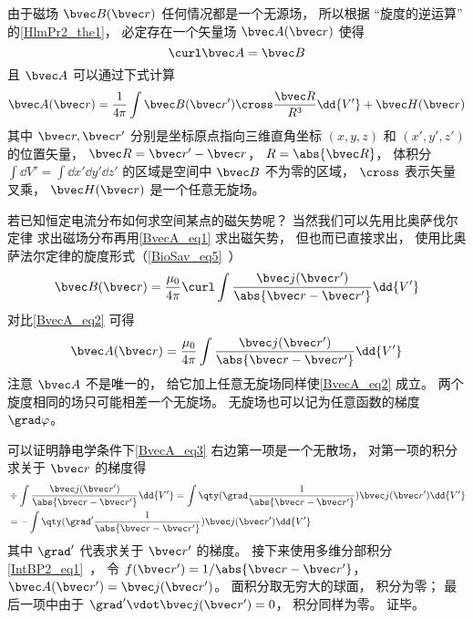 
\begin{issues}
\issueDraft
{}
\end{issues}


由于磁场 $\bvec B(\bvec r)$ 任何情况都是一个无源场， 所以根据 “旋度的逆运算” 的\autoref{HlmPr2_the1}， 必定存在一个矢量场 $\bvec A(\bvec r)$ 使得
\begin{equation}\label{BvecA_eq2}
\curl \bvec A = \bvec B
\end{equation}
且 $\bvec A$ 可以通过下式计算
\begin{equation}\label{BvecA_eq1}
\bvec A(\bvec r) = \frac{1}{4\pi} \int \bvec B(\bvec r') \cross \frac{\bvec R}{R^3} \dd{V'} + \bvec H(\bvec r)
\end{equation}
其中 $\bvec r, \bvec r'$ 分别是坐标原点指向三维直角坐标 $(x, y, z)$ 和 $(x', y', z')$ 的位置矢量， $\bvec R = \bvec r' - \bvec r$， $R = \abs{\bvec R}$， 体积分 $\int\dd{V'} = \int\dd{x'}\dd{y'}\dd{z'}$ 的区域是空间中 $\bvec B$ 不为零的区域， $\cross$ 表示矢量叉乘， $\bvec H(\bvec r)$ 是一个任意无旋场。

若已知恒定电流分布如何求空间某点的磁矢势呢？ 当然我们可以先用比奥萨伐尔定律 求出磁场分布再用\autoref{BvecA_eq1} 求出磁矢势， 但也而已直接求出， 使用比奥萨法尔定律的旋度形式（\autoref{BioSav_eq5}~）
\begin{equation}
\bvec B(\bvec r) = \frac{\mu_0}{4\pi} \curl \int \frac{\bvec j(\bvec r')}{\abs{\bvec r - \bvec r'}}\dd{V'}
\end{equation}
对比\autoref{BvecA_eq2} 可得
\begin{equation}\label{BvecA_eq3}
\bvec A(\bvec r) = \frac{\mu_0}{4\pi} \int \frac{\bvec j(\bvec r')}{\abs{\bvec r - \bvec r'}}\dd{V'}
\end{equation}
注意 $\bvec A$ 不是唯一的， 给它加上任意无旋场同样使\autoref{BvecA_eq2} 成立。 两个旋度相同的场只可能相差一个无旋场。 无旋场也可以记为任意函数的梯度 $\grad \varphi$。

可以证明静电学条件下\autoref{BvecA_eq3} 右边第一项是一个无散场， 对第一项的积分求关于 $\bvec r$ 的梯度得
\begin{equation}
\begin{aligned}
&\div \int \frac{\bvec j(\bvec r')}{\abs{\bvec r - \bvec r'}}\dd{V'} = 
\int \qty(\grad\frac{1}{\abs{\bvec r - \bvec r'}}) \bvec j(\bvec r') \dd{V'}\\
&= -\int \qty(\grad' \frac{1}{\abs{\bvec r - \bvec r'}}) \bvec j(\bvec r') \dd{V'}
\end{aligned}
\end{equation}
其中 $\grad'$ 代表求关于 $\bvec r'$ 的梯度。 接下来使用多维分部积分\autoref{IntBP2_eq1}~， 令 $f(\bvec r') = 1/\abs{\bvec r - \bvec r'}$， $\bvec A(\bvec r') = \bvec j(\bvec r')$。 面积分取无穷大的球面， 积分为零； 最后一项中由于 $\grad' \vdot \bvec j(\bvec r') = 0$， 积分同样为零。 证毕。

